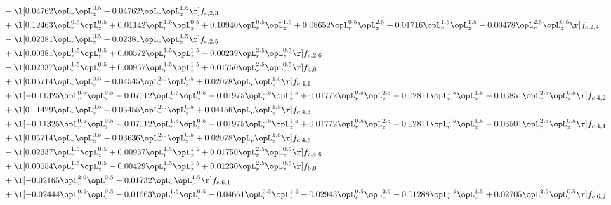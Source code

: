 \begin{alignat}{2}
& - \l[  0.04762 \opL_r \opL_z^{0.5} +  0.04762 \opL_r \opL_z^{1.5}  \r] f_{c,2,3} \nonumber \\ 
& + \l[  0.12463 \opL_r^{0.5} \opL_z^{0.5} +  0.01142 \opL_r^{1.5} \opL_z^{0.5} +  0.10940 \opL_r^{0.5} \opL_z^{1.5} +  0.08652 \opL_r^{0.5} \opL_z^{2.5} +  0.01716 \opL_r^{1.5} \opL_z^{1.5}   -0.00478 \opL_r^{2.5} \opL_z^{0.5}  \r] f_{c,2,4} \nonumber \\ 
& - \l[  0.02381 \opL_r \opL_z^{0.5} +  0.02381 \opL_r \opL_z^{1.5}  \r] f_{c,2,5} \nonumber \\ 
& + \l[  0.00381 \opL_r^{1.5} \opL_z^{0.5} +  0.00572 \opL_r^{1.5} \opL_z^{1.5}   -0.00239 \opL_r^{2.5} \opL_z^{0.5}  \r] f_{c,2,6} \nonumber \\ 
& - \l[  0.02337 \opL_r^{1.5} \opL_z^{0.5} +  0.00937 \opL_r^{1.5} \opL_z^{1.5} +  0.01750 \opL_r^{2.5} \opL_z^{0.5}  \r] f_{4,0} \nonumber \\ 
& + \l[  0.05714 \opL_r \opL_z^{0.5} +  0.04545 \opL_r^{2.0} \opL_z^{0.5} +  0.02078 \opL_r \opL_z^{1.5}  \r] f_{c,4,1} \nonumber \\ 
& + \l[  -0.11325 \opL_r^{0.5} \opL_z^{0.5}   -0.07012 \opL_r^{1.5} \opL_z^{0.5}   -0.01975 \opL_r^{0.5} \opL_z^{1.5} +  0.01772 \opL_r^{0.5} \opL_z^{2.5}   -0.02811 \opL_r^{1.5} \opL_z^{1.5}   -0.03851 \opL_r^{2.5} \opL_z^{0.5}  \r] f_{c,4,2} \nonumber \\ 
& + \l[  0.11429 \opL_r \opL_z^{0.5} +  0.05455 \opL_r^{2.0} \opL_z^{0.5} +  0.04156 \opL_r \opL_z^{1.5}  \r] f_{c,4,3} \nonumber \\ 
& + \l[  -0.11325 \opL_r^{0.5} \opL_z^{0.5}   -0.07012 \opL_r^{1.5} \opL_z^{0.5}   -0.01975 \opL_r^{0.5} \opL_z^{1.5} +  0.01772 \opL_r^{0.5} \opL_z^{2.5}   -0.02811 \opL_r^{1.5} \opL_z^{1.5}   -0.03501 \opL_r^{2.5} \opL_z^{0.5}  \r] f_{c,4,4} \nonumber \\ 
& + \l[  0.05714 \opL_r \opL_z^{0.5} +  0.03636 \opL_r^{2.0} \opL_z^{0.5} +  0.02078 \opL_r \opL_z^{1.5}  \r] f_{c,4,5} \nonumber \\ 
& - \l[  0.02337 \opL_r^{1.5} \opL_z^{0.5} +  0.00937 \opL_r^{1.5} \opL_z^{1.5} +  0.01750 \opL_r^{2.5} \opL_z^{0.5}  \r] f_{c,4,6} \nonumber \\ 
& + \l[  0.00554 \opL_r^{1.5} \opL_z^{0.5}   -0.00429 \opL_r^{1.5} \opL_z^{1.5} +  0.01230 \opL_r^{2.5} \opL_z^{0.5}  \r] f_{6,0} \nonumber \\ 
& + \l[  -0.02165 \opL_r^{2.0} \opL_z^{0.5} +  0.01732 \opL_r \opL_z^{1.5}  \r] f_{c,6,1} \nonumber \\ 
& + \l[  -0.02444 \opL_r^{0.5} \opL_z^{0.5} +  0.01663 \opL_r^{1.5} \opL_z^{0.5}   -0.04661 \opL_r^{0.5} \opL_z^{1.5}   -0.02943 \opL_r^{0.5} \opL_z^{2.5}   -0.01288 \opL_r^{1.5} \opL_z^{1.5} +  0.02705 \opL_r^{2.5} \opL_z^{0.5}  \r] f_{c,6,2} \nonumber \\ 

\end{alignat}
